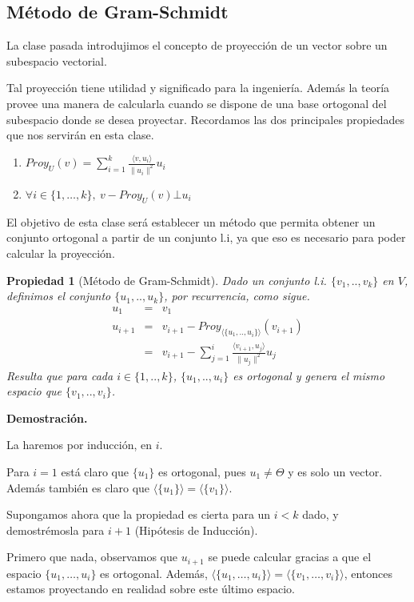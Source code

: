 \documentclass[12pt]{book}
\newtheorem{prop}{Propiedad}
\begin{document}
{\subsection{Método de Gram-Schmidt}

     La clase pasada introdujimos el concepto de proyección de un vector sobre un subespacio vectorial.

Tal proyección tiene utilidad y significado para la ingeniería.
Además la teoría provee una manera de calcularla cuando se dispone de una base ortogonal del subespacio donde se desea proyectar.
Recordamos las dos principales propiedades que nos servirán en esta clase.

\begin{enumerate}
\item $Proy_U(v)=\sum_{i=1}^k \frac{\langle v,u_i\rangle}{\|u_i\|^2}u_i$
\item $\forall i\in\{1,\dots,k\},\ v-Proy_U(v)\bot u_i$
\end{enumerate}

 

El objetivo de esta clase será establecer un método que permita obtener un conjunto ortogonal a partir de un conjunto l.i, ya que eso es necesario para poder calcular la proyección.

\begin{prop}[Método de Gram-Schmidt]
Dado un conjunto l.i. $\{v_1,..,v_k\}$ en $V$, definimos el conjunto $\{u_1,..,u_k\}$, por recurrencia, como sigue.
\begin{eqnarray*}
u_1&=&v_1\\
u_{i+1} & =& v_{i+1} - Proy_{\langle \{u_1,..,u_i\}\rangle}(v_{i+1})\\
&=& v_{i+1}-\sum_{j=1}^i \frac{\langle v_{i+1},u_j\rangle}{\|u_j\|^2}u_j
\end{eqnarray*}
Resulta que para cada $i\in\{1,..,k\}$, $\{u_1,..,u_i\}$ es ortogonal y genera el mismo espacio que $\{v_1,..,v_i\}$.
\end{prop}
{\bf Demostración.} {\small
  La haremos por inducción, en $i$.

  Para $i=1$ está claro que $\{u_1\}$ es ortogonal, pues $u_1\not=\Theta$ y es solo un vector.
  Además también es claro que $\langle\{u_1\}\rangle=\langle\{v_1\}\rangle$.

  Supongamos ahora que la propiedad es cierta para un $i<k$ dado, y demostrémosla para $i+1$ (Hipótesis de Inducción).
  
  Primero que nada, observamos que $u_{i+1}$ se puede calcular gracias a que el espacio $\{u_1,\dots,u_i\}$ es ortogonal. Además, $\langle\{u_1,\dots,u_i\}\rangle=\langle\{v_1,\dots,v_i\}\rangle$, entonces estamos proyectando en realidad sobre este último espacio.

}}
\end{document}
